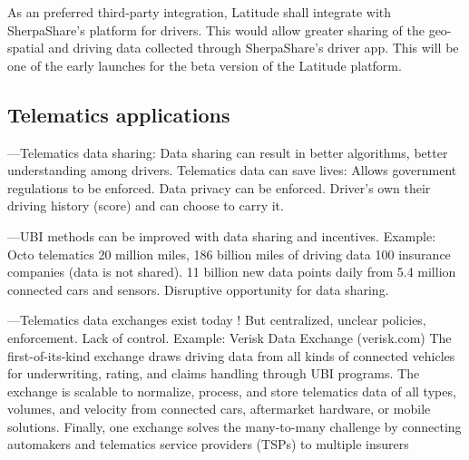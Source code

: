 As an preferred third-party integration, Latitude shall integrate with SherpaShare's platform for drivers. This would
allow greater sharing of the geo-spatial and driving data collected through SherpaShare's driver app. This will be one
of the early launches for the beta version of the Latitude platform.

%
%
%

\subsection{Telematics applications}

---Telematics data sharing:
Data sharing can result in better algorithms, better understanding among drivers.
Telematics data can save lives:
Allows government regulations to be enforced. Data privacy can be enforced.
Driver’s own their driving history (score) and can choose to carry it.


---UBI methods can be improved with data sharing and incentives.
Example:
Octo telematics
20 million miles, 186 billion miles of driving data
100 insurance companies (data is not shared).
11 billion new data points daily from 5.4 million connected cars and sensors.
Disruptive opportunity for data sharing.



---Telematics data exchanges exist today !
But centralized, unclear policies, enforcement.
 Lack of control.
 Example: Verisk Data Exchange (verisk.com)
 The first-of-its-kind  exchange draws driving data from all kinds of connected vehicles for underwriting, rating, and
 claims handling through UBI programs. 
 The exchange is scalable to normalize, process, and store telematics data of all types, volumes, and velocity from
 connected cars, aftermarket hardware, or mobile solutions.
 Finally, one exchange solves the many-to-many challenge by connecting automakers and telematics service providers
 (TSPs) to multiple insurers


